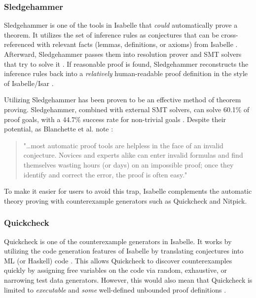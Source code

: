 \subsubsection{Sledgehammer}
\label{sec:Sledgehammer}

Sledgehammer is one of the tools in Isabelle that \emph{could} automatically prove a theorem. It utilizes the set of inference rules as 
conjectures that can be cross-referenced with relevant facts (lemmas, definitions, or axioms) from Isabelle \cite[Sec. 3]{isabelleProof}. 
Afterward, Sledgehammer passes them into resolution prover and SMT solvers that try to solve it \cite[Sec. 3.3]{isabelleProof}. If reasonable 
proof is found, Sledgehammer reconstructs the inference rules back into a \emph{relatively} human-readable proof definition in the style of 
Isabelle/Isar \cite[Sec. 3.4]{isabelleProof}.

Utilizing Sledgehammer has been proven to be an effective method of theorem proving. Sledgehammer, combined with external SMT solvers, can 
solve 60.1\% of proof goals, with a 44.7\% success rate for non-trivial goals \cite[Sec. 6]{isabelleSledgehammerSMT}. Despite their 
potential, as Blanchette et al. note \cite[pp. 2]{isabelleProof}:

\begin{quote}
    "\dots most automatic proof tools are helpless in the face of an invalid conjecture. Novices and experts alike can enter invalid formulas and 
    find themselves wasting hours (or days) on an impossible proof; once they identify and correct the error, the proof is often easy."
\end{quote}

To make it easier for users to avoid this trap, Isabelle complements the automatic theory proving with counterexample generators such as Quickcheck 
and Nitpick.

\subsubsection{Quickcheck}
\label{sec:Quickcheck}

Quickcheck is one of the counterexample generators in Isabelle. It works by utilizing the code generation features of Isabelle by translating 
conjectures into ML (or Haskell) code \cite{isabelleQuickcheck}. This allows Quickcheck to discover counterexamples quickly by assigning 
free variables on the code via random, exhaustive, or narrowing test data generators. However, this would also mean that Quickcheck is limited 
to \emph{executable} and \emph{some} well-defined unbounded proof definitions \cite{isabelleQuickcheck}.

